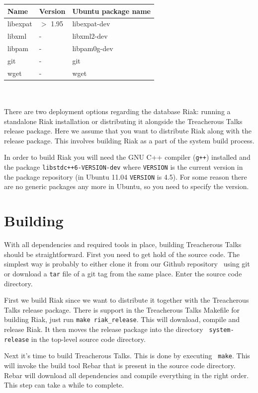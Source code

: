 \documentclass[11pt,a4paper]{report}
\begin{document}
\begin{tabular}{lll}
  Name & Version & Ubuntu package name \\ \hline
  libexpat & $>$ 1.95 & libexpat-dev \\
  libxml   & -        & libxml2-dev \\
  libpam   & -        & libpam0g-dev \\
  git      & -        & git \\
  wget     & -        & wget \\
\end{tabular} \\
\\
There are two deployment options regarding the database Riak: running a
standalone Riak installation or distributing it alongside the Treacherous Talks
release package. Here we assume that you want to distribute Riak along with the
release package. This involves building Riak as a part of the system build
process.

In order to build Riak you will need the GNU C++ compiler ({\tt g++}) installed
and the package {\tt libstdc++6-VERSION-dev} where {\tt VERSION} is the current
version in the package repository (in Ubuntu 11.04 {\tt VERSION} is 4.5). For
some reason there are no generic packages any more in Ubuntu, so you need to
specify the version.
\section{Building}
With all dependencies and required tools in place, building Treacherous Talks
should be straightforward. First you need to get hold of the source code. The
simplest way is probably to either clone it from our Github repository~
\cite{tt-github} using git or download a {\tt tar} file of a git tag
from the same place. Enter the source code directory.

First we build Riak since we want to distribute it together with the Treacherous
Talks release package. There is support in the Treacherous Talks Makefile for
building Riak, just run {\tt make riak\_release}. This will download, compile
and release Riak. It then moves the release package into the directory {\tt
  system-release} in the top-level source code directory.

Next it's time to build Treacherous Talks. This is done by executing {\tt
  make}. This will invoke the build tool Rebar that is present in the source
code directory. Rebar will download all dependencies and compile everything in
the right order. This step can take a while to complete.
\end{document}
